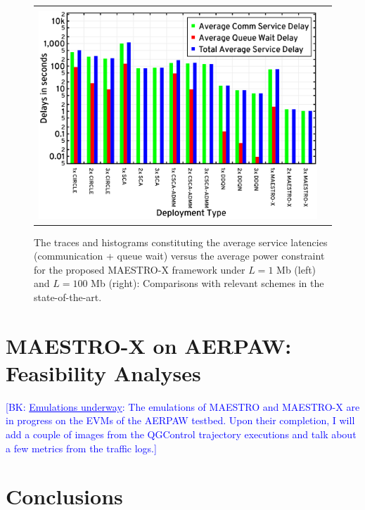 \documentclass[12pt, draftcls, onecolumn]{IEEEtran}
\theoremstyle{plain}
\theoremstyle{definition}
\theoremstyle{remark}
\newcommand{\bk}[1]{\textcolor{blue}{[BK: #1]}}
\begin{document}
\begin{figure}[t]
\begin{tabular}{cc}
\begin{minipage}{0.48\linewidth}
             \\ [1.5ex]
             \centering
             \includegraphics[width=0.9\linewidth]{figs/100Mb_Histogram_II.png}
        \end{minipage}
    \end{tabular}
    \caption{The traces and histograms constituting the average service latencies (communication + queue wait) versus the average power constraint for the proposed MAESTRO-X framework under $L=1$ Mb (left) and $L=100$ Mb (right): Comparisons with relevant schemes in the state-of-the-art.}
    \label{F12}
    \vspace{-8mm}
\end{figure}
\vspace{-4mm}

\section{MAESTRO-X on AERPAW: Feasibility Analyses}\label{S7}
\vspace{-2mm}

\bk{\underline{Emulations underway}: The emulations of MAESTRO and MAESTRO-X are in progress on the EVMs of the AERPAW testbed. Upon their completion, I will add a couple of images from the QGControl trajectory executions and talk about a few metrics from the traffic logs.}


\section{Conclusions}\label{S8}
\vspace{-2mm}
\end{document}
